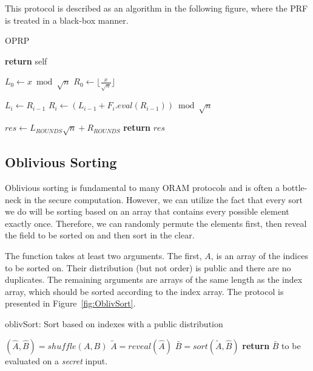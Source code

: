 This protocol is described as an algorithm in the following figure,
where the PRF is treated in a black-box manner.

\begin{algorithm}
\caption{OPRP}
\label{alg:oprp}
\begin{algorithmic}[1]

  
\State \textbf{return} self   
\EndProcedure

\State

\State $L_0 \gets x \bmod \sqrt{n}$
\State $R_0 \gets \lfloor \frac{x}{\sqrt{n}} \rfloor$

\State $L_i \gets R_{i-1}$
\State $R_i \gets ( L_{i-1} + F_{i}.eval(R_{i-1}) ) \bmod \sqrt{n}$
\EndFor

\State $res \gets L_{ROUNDS}\sqrt{n} + R_{ROUNDS}$
\State \textbf{return} $res$
\EndProcedure

\end{algorithmic}
\end{algorithm}
\subsection{Oblivious Sorting}

Oblivious sorting is fundamental to many ORAM protocols and is often
a bottle-neck in the secure computation.
However, we can utilize the fact that every sort we do will be sorting
based on an array that contains every possible element exactly once.
Therefore, we can randomly permute the elements first,
then reveal the field to be sorted on and then sort in the clear.

The function takes at least two arguments. 
The first, $A$, is an array of the indices to be sorted on.
Their distribution (but not order) is public and there are no duplicates.
The remaining arguments are arrays of the same length as the index array,
which should be sorted according to the index array.
The protocol is presented in Figure~\ref{fig:OblivSort}.


\begin{algorithm}
\caption{oblivSort: Sort based on indexes with a public distribution}
\label{fig:OblivSort}
\begin{algorithmic}[0]

\State $(\hat{A} , \hat{B}) = shuffle(A, B)$
\State $\tilde{A} = reveal(\hat{A})$
\State $\bar{B} = sort(\tilde{A}, \hat{B})$
\State \textbf{return} $\bar{B}$
to be evaluated on a \emph{secret} input.
\EndProcedure

\end{algorithmic}
\end{algorithm}

